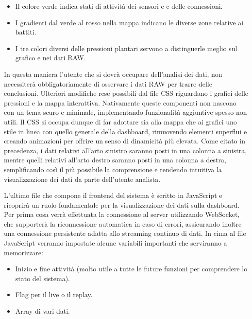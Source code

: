 \documentclass[target=bach,aauheader=,style=]{thud}
\begin{document}
\begin{itemize}
  \item Il colore verde indica stati di attività dei sensori e e delle connessioni.
  \item I gradienti dal verde al rosso nella mappa indicano le diverse zone relative ai battiti.
  \item I tre colori diversi delle pressioni plantari servono a distinguerle meglio sul grafico e nei dati RAW. 
\end{itemize}
In questa maniera l'utente che si dovrà occupare dell'analisi dei dati, non necessiterà obbligatoriamente di osservare i dati RAW per trarre delle conclusioni. Ulteriori modifiche rese possibili dal file CSS riguardano i grafici delle pressioni e la mappa interattiva. Nativamente queste componenti non nascono con un tema scuro e minimale, implementando funzionalità aggiuntive spesso non utili. Il CSS si occupa dunque di far adottare sia alla mappa che ai grafici uno stile in linea con quello generale della dashboard, rimuovendo elementi superflui e creando animazioni per offrire un senso di dinamicità più elevata. Come citato in precedenza, i dati relativi all'arto sinistro saranno posti in una colonna a sinistra, mentre quelli relativi all'arto destro saranno posti in una colonna a destra, semplificando così il più possibile la comprensione e rendendo intuitiva la visualizzazione dei dati da parte dell'utente analista.

L'ultimo file che compone il frontend del sistema è scritto in JavaScript e ricoprirà un ruolo fondamentale per la visualizzazione dei dati sulla dashboard. Per prima cosa verrà effettuata la connessione al server utilizzando WebSocket, che supporterà la riconnessione automatica in caso di errori, assicurando inoltre una connessione persistente adatta allo streaming continuo di dati. In cima al file JavaScript verranno impostate alcune variabili importanti che serviranno a memorizzare:
\begin{itemize}
  \item Inizio e fine attività (molto utile a tutte le future funzioni per comprendere lo stato del sistema).
  \item Flag per il live o il replay.
  \item Array di vari dati. 
\end{itemize}
\end{document}

